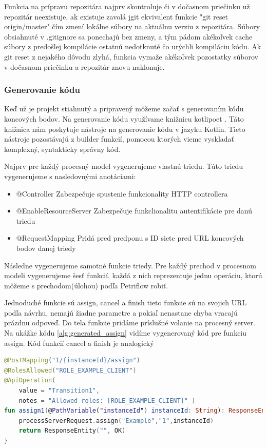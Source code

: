 Funkcia na prípravu repozitára najprv skontroluje či v dočasnom priečinku už repozitár neexistuje, ak existuje zavolá jgit ekvivalent funkcie "git reset origin/master" čím zmení lokálne súbory na aktuálnu verziu z repozitára. Súbory obsiahnuté v .gitignore sa ponechajú bez zmeny, a tým pádom akékoľvek cache súbory z predošlej kompilácie ostatnú nedotknuté čo urýchli kompiláciu kódu. Ak git reset z nejakého dôvodu zlyhá, funkcia vymaže akékoľvek pozostatky súborov v dočasnom priečinku a repozitár znovu naklonuje.

\subsubsection{Generovanie kódu}
Keď už je projekt stiahnutý a pripravený môžeme začať s generovaním kódu koncových bodov. Na generovanie kódu  využívame knižnicu kotlipoet \cite{kotlipoet}. Táto knižnica nám poskytuje nástroje na generovanie kódu v jazyku Kotlin. Tieto nástroje pozostávajú z builder funkcií, pomocou ktorých vieme vyskladať komplexný, syntakticky správny kód.

Najprv pre každý procesný model vygenerujeme vlastnú triedu. Túto triedu vygenerujeme s nasledovnými anotáciami:

\begin{itemize}
	\item @Controller Zabezpečuje spustenie funkcionality HTTP controllera
	\item @EnableResourceServer Zabezpečuje funkclionalitu autentifikácie pre danú triedu
	\item @RequestMapping Pridá pred predponu s ID siete pred URL koncových bodov danej triedy
\end{itemize}

Následne vygenerujeme samotné funkcie triedy. Pre každý prechod v procesnom modeli vygenerujeme šesť funkcií. každá z nich reprezentuje jednu operáciu, ktorú môžeme s prechodom(úlohou) podľa Petriflow robiť.

Jednoduché funkcie sú assign, cancel a finish tieto funkcie sú na svojich URL podľa návrhu, nemajú žiadne parametre a pokiaľ nenastane chyba vracajú prázdnu odpoveď. Do tela funkcie pridáme príslušné volanie na procesný server. Na ukážke kódu \ref{alg:generated_assign} vidíme vygenerovaný kód pre funkciu assign. Kód funkcií cancel a finish je analogický

\begin{lstlisting}[float, caption={Príklad vygenerovanej funkcie},label={alg:generated_assign},language=Kotlin]
@PostMapping("1/{instanceId}/assign")
@RolesAllowed("ROLE_EXAMPLE_CLIENT")
@ApiOperation(
	value = "Transition1",
	notes = "Allowed roles: [ROLE_EXAMPLE_CLIENT]" )
fun assign1(@PathVariable("instanceId") instanceId: String): ResponseEntity<String> {
	processServerRequest.assign("Example","1",instanceId)
	return ResponseEntity("", OK)
}
\end{lstlisting}

